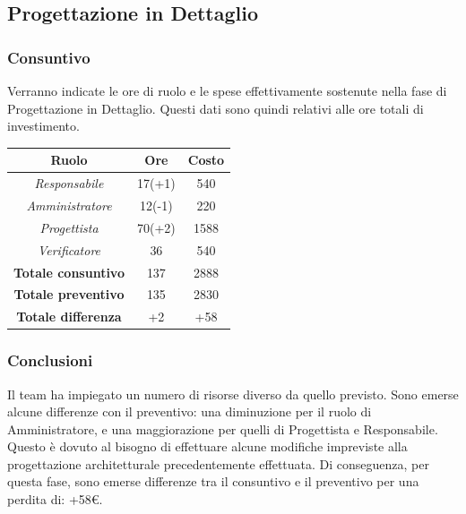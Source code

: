 \subsection{Progettazione in Dettaglio}

\subsubsection{Consuntivo}

Verranno indicate le ore di ruolo e le spese effettivamente sostenute nella fase di Progettazione in Dettaglio. Questi dati sono quindi relativi alle ore totali di investimento.

\begin{center}
	\centering
	\begin{tabular}{|c|c|c|}
		\hline
		\textbf{Ruolo} & \textbf{Ore} & \textbf{Costo} \\
		\hline
		\emph{Responsabile}  & 17(+1) & 540 \\
		\hline  \emph{Amministratore}  & 12(-1) & 220 \\
		\hline  \emph{Progettista}  & 70(+2) & 1588 \\
		\hline  \emph{Verificatore}  & 36 & 540 \\
		\hline
		\textbf{Totale consuntivo} & 137 & 2888 \\
		\hline
		\textbf{Totale preventivo} & 135 & 2830 \\
		\hline
		\textbf{Totale differenza} & +2 & +58 \\
		\hline
	\end{tabular}
	
\end{center}

\subsubsection{Conclusioni}

Il team ha impiegato un numero di risorse diverso da quello previsto. Sono emerse alcune differenze con il preventivo: una diminuzione per il ruolo di Amministratore, e una maggiorazione per quelli di Progettista e Responsabile. Questo è dovuto al bisogno di effettuare alcune modifiche impreviste alla progettazione architetturale precedentemente effettuata. 
Di conseguenza, per questa fase, sono emerse differenze tra il consuntivo e il preventivo per una perdita di: +58€.

